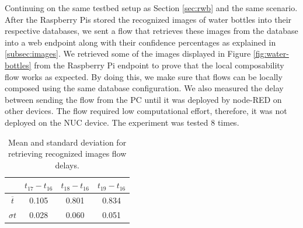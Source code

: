  \noindent Continuing on the same testbed setup as Section \ref{sec:rwb} and the same scenario.  After the Raspberry Pis stored the recognized images of water bottles into their respective  databases, we sent a flow that retrieves these images from the database into a web endpoint along with their confidence percentages as explained in \ref{subsec:images}.  We retrieved some of the images displayed in  Figure \ref{fig:water-bottles} from the  Raspberry Pi endpoint to prove that the local composability flow works as expected. By doing this, we make sure that flows can be locally composed using the same database configuration. We also measured the delay between sending the flow from the PC until it was deployed by node-RED on other devices. The flow required low computational effort, therefore, it was not  deployed on the NUC device. The experiment was tested 8 times.

\begin{table}[H]
	\centering
	\begin{tabular}{ c | c | c| c }	\toprule
		&$t_{17} - t_{16}$  & $t_{18} - t_{16}$  & $t_{19}-t_{16}$ \\ \midrule
		$ \overline{t} $&	0.105&	0.801&	0.834\\
		$ \sigma t $&	0.028&	0.060&	0.051\\
	\end{tabular}
	\caption{Mean and standard deviation for retrieving recognized images flow delays.}
	\label{table:images}
\end{table}


